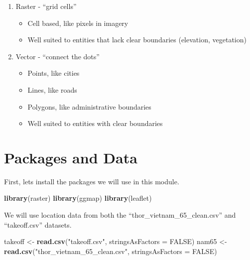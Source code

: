 \documentclass[oneside]{memoir}
\newenvironment{Shaded}{\begin{snugshade}}{\end{snugshade}}
\newcommand{\KeywordTok}[1]{\textcolor[rgb]{0.13,0.29,0.53}{\textbf{#1}}}
\newcommand{\DataTypeTok}[1]{\textcolor[rgb]{0.13,0.29,0.53}{#1}}
\newcommand{\StringTok}[1]{\textcolor[rgb]{0.31,0.60,0.02}{#1}}
\newcommand{\OtherTok}[1]{\textcolor[rgb]{0.56,0.35,0.01}{#1}}
\newcommand{\NormalTok}[1]{#1}
\providecommand{\tightlist}{%
  \setlength{\itemsep}{0pt}\setlength{\parskip}{0pt}}
\theoremstyle{definition}
\theoremstyle{definition}
\theoremstyle{definition}
\theoremstyle{remark}
\begin{document}
\begin{enumerate}
\def\labelenumi{\arabic{enumi}.}
\tightlist
\item
  Raster - ``grid cells''

  \begin{itemize}
  \tightlist
  \item
    Cell based, like pixels in imagery
  \item
    Well suited to entities that lack clear boundaries (elevation,
    vegetation)
  \end{itemize}
\item
  Vector - ``connect the dots''

  \begin{itemize}
  \tightlist
  \item
    Points, like cities
  \item
    Lines, like roads
  \item
    Polygons, like administrative boundaries
  \item
    Well suited to entities with clear boundaries
  \end{itemize}
\end{enumerate}

\section{Packages and Data}\label{packages-and-data}

First, lets install the packages we will use in this module.

\begin{Shaded}
\begin{Highlighting}[]
\KeywordTok{library}\NormalTok{(raster)}
\KeywordTok{library}\NormalTok{(ggmap)}
\KeywordTok{library}\NormalTok{(leaflet)}
\end{Highlighting}
\end{Shaded}

We will use location data from both the ``thor\_vietnam\_65\_clean.csv''
and ``takeoff.csv'' datasets.

\begin{Shaded}
\begin{Highlighting}[]
\NormalTok{takeoff <-}\StringTok{ }\KeywordTok{read.csv}\NormalTok{(}\StringTok{"takeoff.csv"}\NormalTok{, }\DataTypeTok{stringsAsFactors =} \OtherTok{FALSE}\NormalTok{)}
\NormalTok{nam65 <-}\StringTok{ }\KeywordTok{read.csv}\NormalTok{(}\StringTok{"thor_vietnam_65_clean.csv"}\NormalTok{, }\DataTypeTok{stringsAsFactors =} \OtherTok{FALSE}\NormalTok{)}
\end{Highlighting}
\end{Shaded}
\end{document}
